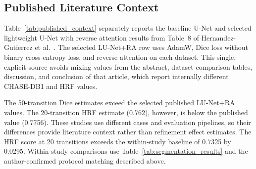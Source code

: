 \documentclass[jimaging,article,submit,pdftex,moreauthors]{Definitions/mdpi}%
\begin{document}
\subsection{Published Literature Context}



Table~\ref{tab:published_context} separately reports the baseline U-Net and selected lightweight U-Net with reverse attention results from Table~8 of Hernandez-Gutierrez et al.~\cite{Hernandez2025}. The selected LU-Net+RA row uses AdamW, Dice loss without binary cross-entropy loss, and reverse attention on each dataset. This single, explicit source avoids mixing values from the abstract, dataset-comparison tables, discussion, and conclusion of that article, which report internally different CHASE-DB1 and HRF values.



\begin{table}[htbp]
\centering
\caption{Published contextual results from Table~8 of Hernandez-Gutierrez et al.~\cite{Hernandez2025}. These values were obtained under that study's partitioning, validation, preprocessing, and metric procedures and are not controlled before-refinement measurements for Table~\ref{tab:segmentation_results}.}
\label{tab:published_context}
\small
{}
\end{table}



The 50-transition Dice estimates exceed the selected published LU-Net+RA values. The 20-transition HRF estimate (0.762), however, is below the published value (0.7756). These studies use different cases and evaluation pipelines, so their differences provide literature context rather than refinement effect estimates. The HRF score at 20 transitions exceeds the within-study baseline of 0.7325 by 0.0295. Within-study comparisons use Table~\ref{tab:segmentation_results} and the author-confirmed protocol matching described above.
\end{document}
